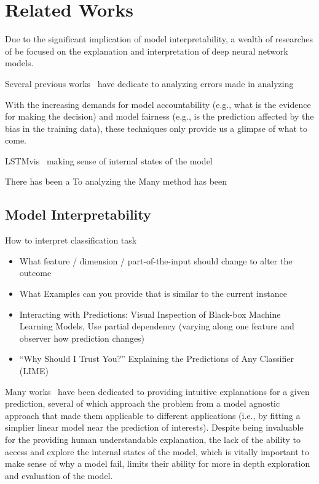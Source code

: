 \section{Related Works}
Due to the significant implication of model interpretability, a wealth of researches of be focused on the explanation and interpretation of deep neural network models.

Several previous works~\cite{BilalJourablooYe2018} have dedicate to analyzing errors made in analyzing 

With the increasing demands for model accountability (e.g., what is the evidence for making the decision) and model fairness (e.g., is the prediction affected by the bias in the training data), these techniques only provide us a glimpse of what to come. 

LSTMvis~\cite{StrobeltGehrmannHuber2016} making sense of internal states of the model

There has been a
To analyzing the
Many method has been


\subsection{Model Interpretability}

How to interpret classification task
\begin{itemize}
    \item What feature / dimension / part-of-the-input should change to
    alter the outcome
    \item What Examples can you provide that is similar to the current
    instance
\end{itemize}
\begin{itemize}
    \item Interacting with Predictions: Visual Inspection of Black-box Machine Learning Models,
    Use partial dependency (varying along one feature and observer how prediction changes)
    \item “Why Should I Trust You?” Explaining the Predictions of Any Classifier (LIME)
\end{itemize}
%
Many works~\cite{RibeiroSinghGuestrin2016} have been dedicated to providing intuitive explanations for a given prediction, several of which approach the problem from a model agnostic approach that made them applicable to different applications (i.e., by fitting a simplier linear model near the prediction of interests).
%
Despite being invaluable for the providing human understandable explanation, the lack of the ability to access and explore the internal states of the model, which is vitally important to make sense of why a model fail, limits their ability for more in depth exploration and evaluation of the model.


